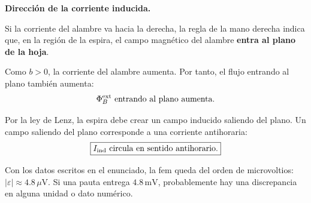 \documentclass[11pt]{article}
\newcommand{\paso}[1]{%
  \par\medskip
  \noindent\textbf{#1}\par
  \vspace{0.1em}%
}
\begin{document}
\paso{Direcci\'on de la corriente inducida.}
Si la corriente del alambre va hacia la derecha, la regla de la mano derecha indica que, en la regi\'on de la espira, el campo magn\'etico del alambre \textbf{entra al plano de la hoja}.

Como $b>0$, la corriente del alambre aumenta. Por tanto, el flujo entrando al plano tambi\'en aumenta:
\begin{equation*}
    \Phi_B^{\rm ext}\ \text{entrando al plano aumenta}.
\end{equation*}

Por la ley de Lenz, la espira debe crear un campo inducido saliendo del plano. Un campo saliendo del plano corresponde a una corriente antihoraria:
\begin{equation*}
    \boxed{I_{\rm ind}\ \text{circula en sentido antihorario}.}
\end{equation*}


Con los datos escritos en el enunciado, la fem queda del orden de microvoltios: $|\varepsilon|\approx4.8\,\mu\mathrm{V}$. Si una pauta entrega $4.8\,\mathrm{mV}$, probablemente hay una discrepancia en alguna unidad o dato num\'erico.
\end{document}
